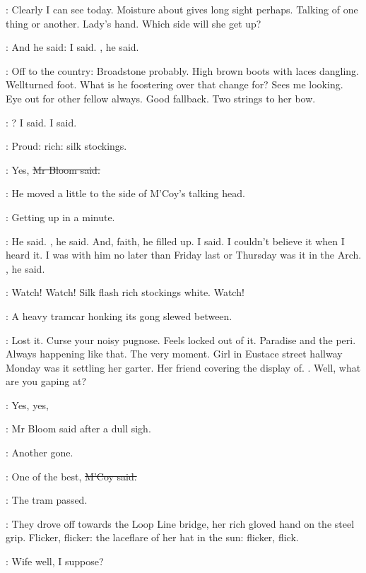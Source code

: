 \BloomInt:
Clearly I can see today.
Moisture about gives long sight perhaps.
Talking of one thing or another.
Lady's hand.
Which side will she get up?

\mccoy:
And he said: 
 I said.
, he said.

\BloomInt:
Off to the country:
Broadstone probably.
High brown boots with laces dangling.
Wellturned foot.
What is he foostering over that change for?
Sees me looking.
Eye out for other fellow always.
Good fallback.
Two strings to her bow.

\mccoy:
? I said.
 I said.

\BloomInt:
Proud:
rich:
silk stockings.

\Bloom:
Yes,
\sout{Mr Bloom said.}

:
He moved a little to the side of M'Coy's talking head.

\BloomInt:
Getting up in a minute.

\mccoy:
 He said.
, he said.
And, faith, he filled up.
 I said.
I couldn't believe it when I heard it.
I was with him no later than Friday last
or Thursday was it
in the Arch.
, he said.

\BloomInt:
Watch!
Watch!
Silk flash rich stockings white.
Watch!

:
A heavy tramcar honking its gong
slewed between.

\BloomInt:
Lost it.
Curse your noisy pugnose.
Feels locked out of it.
Paradise and the peri.
Always happening like that.
The very moment.
Girl in Eustace street hallway
Monday was it
settling her garter.
Her friend covering the display of.
.
Well, what are you gaping at?

\Bloom:
Yes, yes,

:
Mr Bloom said after a dull sigh.

\Bloom:
Another gone.

\mccoy:
One of the best,
\sout{M'Coy said.}

:
The tram passed.

:
They drove off towards the Loop Line bridge,
her rich gloved hand on the steel grip.
Flicker, flicker:
the laceflare of her hat in the sun:
flicker, flick.

\mccoy:
Wife well, I suppose?

